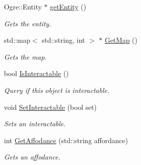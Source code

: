 \begin{DoxyCompactItemize}
Ogre\-::\-Entity $\ast$ \hyperlink{class_objects_1_1_i_object_a5ce456cbcf26b929e255da515c5b37a9}{get\-Entity} ()
\begin{DoxyCompactList}\small\item\em Gets the entity. \end{DoxyCompactList}\item 
std\-::map$<$ std\-::string, int $>$ $\ast$ \hyperlink{class_objects_1_1_i_object_a22b3acfb9b300a09409ac4c986a434a0}{Get\-Map} ()
\begin{DoxyCompactList}\small\item\em Gets the map. \end{DoxyCompactList}\item 
bool \hyperlink{class_objects_1_1_i_object_abaa11138d53ef4976630589899c73539}{Is\-Interactable} ()
\begin{DoxyCompactList}\small\item\em Query if this object is interactable. \end{DoxyCompactList}\item 
void \hyperlink{class_objects_1_1_i_object_a535d1642eae42de6acba933d142defb1}{Set\-Interactable} (bool set)
\begin{DoxyCompactList}\small\item\em Sets an interactable. \end{DoxyCompactList}\item 
int \hyperlink{class_objects_1_1_i_object_aeb573744a2a56f455d85fc06c7b27e37}{Get\-Affodance} (std\-::string affordance)
\begin{DoxyCompactList}\small\item\em Gets an affodance. \end{DoxyCompactList}\end{DoxyCompactItemize}
